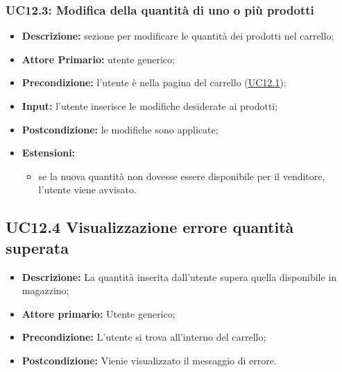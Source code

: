 \subsubsection{UC12.3: Modifica della quantità di uno o più prodotti}
\label{sec:UC12.3}
\begin{itemize}
    \item \textbf{Descrizione:} sezione per modificare le quantità dei prodotti nel carrello;
    \item \textbf{Attore Primario:} utente generico;
    \item \textbf{Precondizione:} l'utente è nella pagina del carrello (\hyperref[sec:UC12.1]{\underline{UC12.1}});
    \item \textbf{Input:} l'utente inserisce le modifiche desiderate ai prodotti;
    \item \textbf{Postcondizione:} le modifiche sono applicate;
    \item \textbf{Estensioni:}
          \begin{itemize}
              \item se la nuova quantità non dovesse essere disponibile per il venditore, l'utente viene avvisato.
          \end{itemize}
\end{itemize}
\subsection{UC12.4 Visualizzazione errore quantità superata}
\label{sec:UC12.4}
\begin{itemize}
    \item \textbf{Descrizione:} La quantità inserita dall'utente supera quella disponibile in magazzino;
    \item \textbf{Attore primario:} Utente generico;
    \item \textbf{Precondizione:} L'utente si trova all'interno del carrello;
    \item \textbf{Postcondizione:} Vienie visualizzato il messaggio di errore.
\end{itemize}